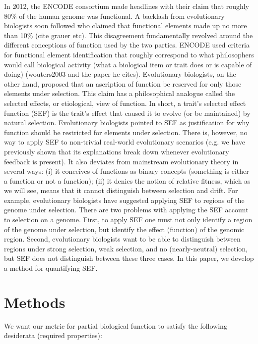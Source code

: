 \documentclass{article}
\begin{document}
In 2012, the ENCODE consortium made headlines with their claim that roughly 80\% of the human genome was functional.
A backlash from evolutionary biologists soon followed who claimed that functional elements made up no more than 10\% (cite grauer etc).
This disagreement fundamentally revolved around the different conceptions of function used by the two parties.
ENCODE used criteria for functional element identification that roughly correspond to what philosophers would call biological activity (what a biological item or trait does or is capable of doing) (wouters2003 and the paper he cites).
Evolutionary biologists, on the other hand, proposed that an ascription of function be reserved for only those elements under selection.
This claim has a philosophical analogue called the selected effects, or etiological, view of function.
In short, a trait's selected effect function (SEF) is the trait's effect that caused it to evolve (or be maintained) by natural selection.
Evolutionary biologists pointed to SEF as justification for why function should be restricted for elements under selection.
There is, however, no way to apply SEF to non-trivial real-world evolutionary scenarios (e.g. we have previously shown that its explanations break down whenever evolutionary feedback is present).
It also deviates from mainstream evolutionary theory in several ways: (i) it conceives of functions as binary concepts (something is either a function or not a function); (ii) it denies the notion of relative fitness, which as we will see, means that it cannot distinguish between selection and drift.
For example, evolutionary biologists have suggested applying SEF to regions of the genome under selection.
There are two problems with applying the SEF account to selection on a genome.
First, to apply SEF one must not only identify a region of the genome under selection, but identify the effect (function) of the genomic region.
Second, evolutionary biologists want to be able to distinguish between regions under strong selection, weak selection, and no (nearly-neutral) selection, but SEF does not distinguish between these three cases.
In this paper, we develop a method for quantifying SEF.

\section{Methods}
\label{sec:methods}

We want our metric for partial biological function to satisfy the following desiderata (required properties):
\end{document}
